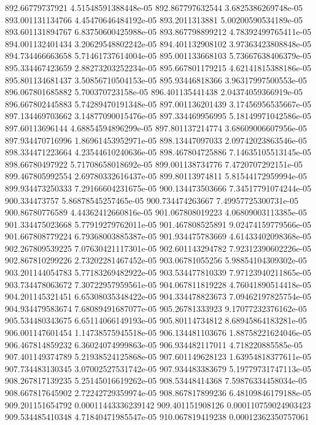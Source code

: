 {892.66779737921 4.51548591388448e-05
892.867797632544 3.6825386269748e-05
893.001131134766 4.45470646484192e-05
893.2011313881 5.00200590534189e-05
893.601131894767 6.83750600425988e-05
893.867798899212 4.78392499765411e-05
894.001132401434 3.20629548802242e-05
894.401132908102 3.97363423808848e-05
894.734466663658 5.71461737614004e-05
895.001133668103 5.73667638406379e-05
895.334467423659 2.88273203252234e-05
895.667801179215 4.62141815388186e-05
895.801134681437 3.50856710504153e-05
895.93446818366 3.96317997500553e-05
896.067801685882 5.700370723158e-05
896.401135441438 2.04374059366919e-05
896.667802445883 5.74289470191348e-05
897.001136201439 3.17456956535667e-05
897.134469703662 3.14877090015476e-05
897.334469956995 5.18149971042586e-05
897.60113696144 4.68854594896299e-05
897.801137214774 3.68609006607956e-05
897.934470716996 1.86961453952971e-05
898.13447097033 2.09742023863546e-05
898.334471223664 4.23544610240636e-05
898.467804725886 7.14635105513145e-05
898.66780497922 5.71708658018692e-05
899.001138734776 7.4720707292151e-05
899.467805992554 2.69780332616437e-05
899.80113974811 5.81544172959994e-05
899.934473250333 7.29166604231675e-05
900.134473503666 7.34517791074244e-05
900.334473757 5.86878545257465e-05
900.734474263667 7.49957725300731e-05
900.86780776589 4.44362412660816e-05
901.067808019223 4.06809003113385e-05
901.334475023668 5.77919279762011e-05
901.467808525891 9.02474159779566e-05
901.667808779224 6.79368003885387e-05
901.934475783669 4.61433402098368e-05
902.267809539225 7.07630421117301e-05
902.601143294782 7.92312390602226e-05
902.867810299226 2.73202281467452e-05
903.06781055256 5.98854104309302e-05
903.201144054783 5.77183269482922e-05
903.534477810339 7.97123940211865e-05
903.734478063672 7.30722957959561e-05
904.067811819228 4.76041890514418e-05
904.201145321451 6.65308035348422e-05
904.334478823673 7.09462197825754e-05
904.934479583674 7.68089491687077e-05
905.26781333923 9.17077232376162e-05
905.534480343675 6.65114066149193e-05
905.80114734812 8.68945864183281e-05
906.001147601454 1.14738575945518e-05
906.134481103676 1.88758221624046e-05
906.467814859232 6.36024074999863e-05
906.934482117011 4.718220885585e-05
907.401149374789 5.21938524125868e-05
907.601149628123 1.63954818377611e-05
907.734483130345 3.07002527531742e-05
907.934483383679 5.19779731747113e-05
908.267817139235 5.25145016619262e-05
908.53448414368 7.59876334458034e-05
908.667817645902 2.72242729359974e-05
908.867817899236 6.48109846179188e-05
909.201151654792 0.00011443336239142
909.401151908126 0.000110759024903423
909.534485410348 4.71840471985547e-05
910.067819419238 0.00012362350757061
}
